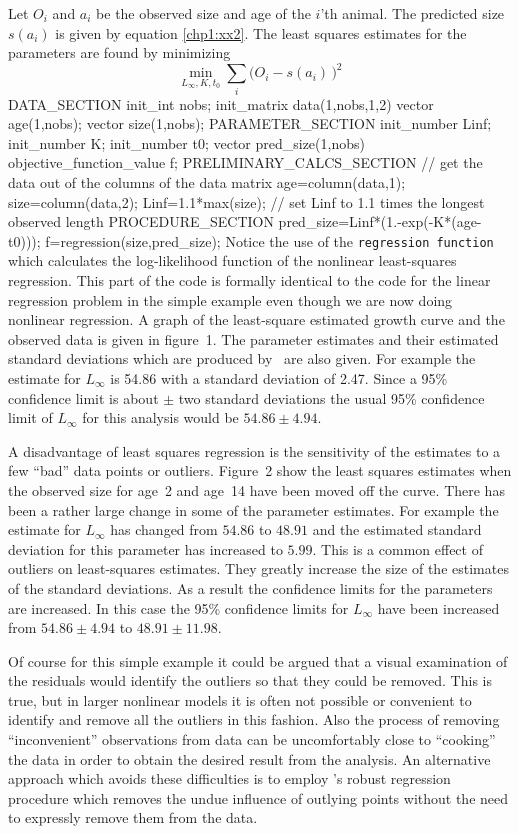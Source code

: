 \documentclass[12pt]{book}
\begin{document}
Let $O_i$ and $a_i$ be the observed size and age of the $i$'th 
animal. The predicted size $s(a_i)$ is given by equation \ref{chp1:xx2}.
The least squares estimates for the parameters are found by minimizing
$$\min_{L_\infty,K,t_0} \sum_i \big(O_i -s(a_i)\,\big)^2$$
\beginexample
DATA_SECTION
  init_int nobs;
  init_matrix data(1,nobs,1,2)
  vector age(1,nobs);
  vector size(1,nobs);
PARAMETER_SECTION
  init_number Linf;
  init_number K;
  init_number t0;
  vector pred_size(1,nobs)
  objective_function_value f;
PRELIMINARY_CALCS_SECTION
  // get the data out of the columns of the data matrix 
  age=column(data,1);
  size=column(data,2);
  Linf=1.1*max(size);  // set Linf to 1.1 times the longest observed length
PROCEDURE_SECTION
  pred_size=Linf*(1.-exp(-K*(age-t0)));
  f=regression(size,pred_size);
\endexample
Notice the use of the 
{\tt regression function} which calculates the
log-likelihood function of the nonlinear least-squares regression. 
 This part of the code is formally
identical to the code for the linear regression problem in the
simple example even though we are now doing nonlinear regression.
A graph of the least-square estimated growth curve and the observed
data is given in figure~1. The parameter estimates and their estimated 
standard deviations which are produced by \ADM\ are also given.
For example the estimate for $L_\infty$ is  54.86 with a standard
deviation of 2.47. Since a 95\% confidence limit is about 
$\pm$ two standard deviations the usual 95\% confidence limit of
$L_\infty$ for this analysis would be $54.86\pm 4.94$.

A disadvantage of least squares regression is the sensitivity of the 
estimates to a few ``bad'' data points or outliers. Figure~2 show the
least squares estimates when the observed size for age~2 and age~14
have been moved off the curve.
There has been a rather large change in some of the parameter
estimates. For example the estimate for $L_\infty$ has changed
from $54.86$ to $48.91$ and the estimated standard deviation for
this parameter has increased to $5.99.$
This is a common effect of outliers on least-squares estimates.
They greatly increase  the size of the estimates of the standard deviations.
As a result the confidence limits for the parameters are increased.
In this case the 95\% confidence limits  for 
$L_\infty$ have been increased from $54.86\pm 4.94$ to $48.91\pm 11.98$.

\medbreak
Of course for this simple example it could be argued that a visual
examination of the residuals would identify the outliers so that
they could be removed. This is true, but in larger nonlinear models
it is often not possible or convenient to identify and remove
all the outliers in this fashion. Also the process of removing
``inconvenient'' observations from data can be uncomfortably
close to ``cooking'' the data in order to obtain the desired result
from the analysis. An alternative approach which avoids these
difficulties is to employ \ADM's robust regression procedure
which removes the undue influence of outlying points without the
need to expressly remove them from the data.
\end{document}

